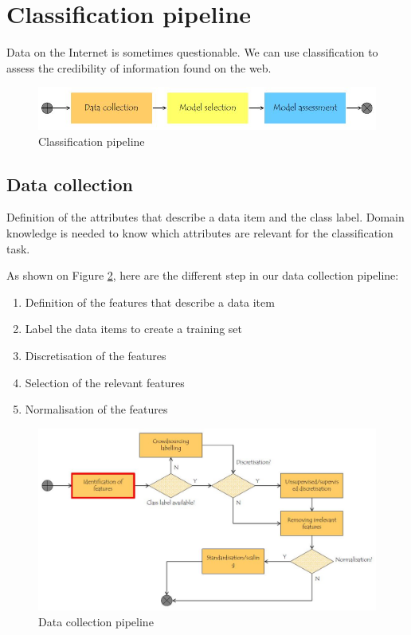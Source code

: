 \section{Classification pipeline}
Data on the Internet is sometimes questionable. We can use classification to assess the credibility of information found on the web.

\begin{figure}[!ht]
  \centering
  \includegraphics[width=1.0\linewidth]{figures/classification_pipeline}
  \caption{Classification pipeline}
  \label{fig:classificationPipeline}
\end{figure}

\subsection*{Data collection}
Definition of the attributes that describe a data item and the class label. Domain knowledge is needed to know which attributes are relevant for the classification task.

As shown on Figure \ref{fig:dataCollection}, here are the different step in our data collection pipeline:
\begin{enumerate}
	\item Definition of the features that describe a data item
	\item Label the data items to create a training set
	\item Discretisation of the features
	\item Selection of the relevant features
	\item Normalisation of the features
\end{enumerate}

\begin{figure}[!ht]
  \centering
  \includegraphics[width=1.0\linewidth]{figures/data_collection}
  \caption{Data collection pipeline}
  \label{fig:dataCollection}
\end{figure}


